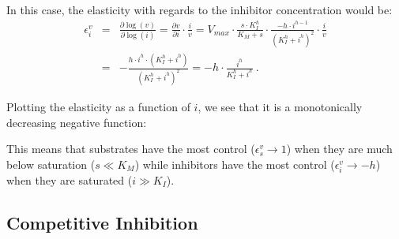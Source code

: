 \documentclass[12pt,a4paper]{article}
\begin{document}
In this case, the elasticity with regards to the inhibitor concentration would be:
\begin{eqnarray}
    \epsilon_i^v &=& \frac{\partial \log(v)}{\partial \log(i)} = \frac{\partial v}{\partial i}\cdot\frac{i}{v} = V_{max} \cdot \frac{s \cdot K_I^h}{K_M + s} \cdot \frac{- h \cdot i^{h-1}}{(K_I^h + i^h)^2} \cdot \frac{i}{v} \nonumber \\
    &=& -\frac{h \cdot i^h \cdot (K_I^h + i^h)}{(K_I^h + i^h)^2} = -h \cdot \frac{i^h}{K_I^h + i^h}~.
\end{eqnarray}

Plotting the elasticity as a function of $i$, we see that it is a monotonically decreasing negative function:


This means that substrates have the most control ($\epsilon_s^v \rightarrow 1$) when they are much below saturation ($s \ll K_M$) while inhibitors have the most control ($\epsilon_i^v \rightarrow -h$) when they are saturated ($i \gg K_I$).


\subsection{Competitive Inhibition}
\end{document}
